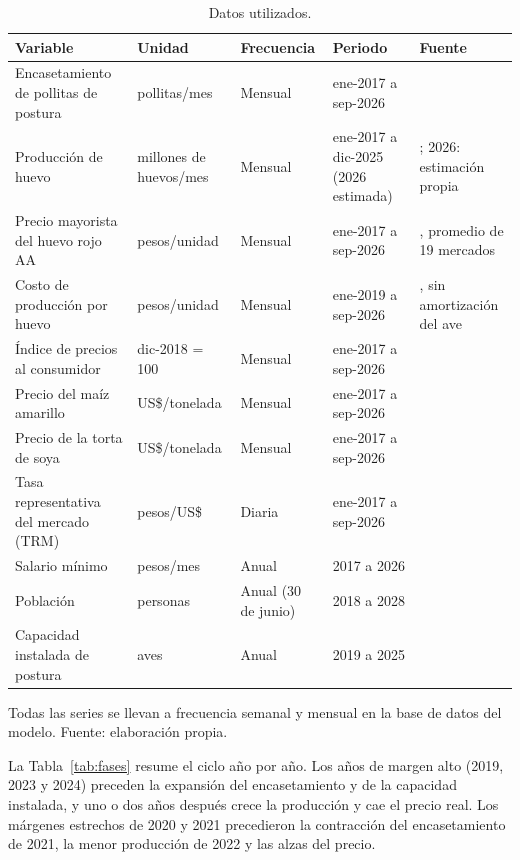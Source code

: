 \documentclass[preprint,12pt,authoryear]{elsarticle}
\begin{document}
\begin{table}[!htbp]
\centering
\caption{Datos utilizados.}
\label{tab:datos}
\footnotesize
\setlength{\tabcolsep}{4pt}
\begin{tabularx}{\textwidth}{@{}P{3.0cm}P{2.1cm}P{1.5cm}P{2.1cm}L@{}}
\toprule
Variable & Unidad & Frecuencia & Periodo & Fuente \\
\midrule
Encasetamiento de pollitas de postura & pollitas/mes & Mensual & ene-2017 a sep-2026 & \citet{Fenavi2026Estadisticas} \\
Producción de huevo & millones de huevos/mes & Mensual & ene-2017 a dic-2025 (2026 estimada) & \citet{Fenavi2026Fenaviquin440}; 2026: estimación propia \\
Precio mayorista del huevo rojo AA & pesos/unidad & Mensual & ene-2017 a sep-2026 & \citet{DANE2026SIPSA}, promedio de 19 mercados \\
Costo de producción por huevo & pesos/unidad & Mensual & ene-2019 a sep-2026 & \citet{Fenavi2026Costos}, sin amortización del ave \\
Índice de precios al consumidor & dic-2018 = 100 & Mensual & ene-2017 a sep-2026 & \citet{DANE2026IPC} \\
Precio del maíz amarillo & US\$/tonelada & Mensual & ene-2017 a sep-2026 & \citet{WorldBank2026PinkSheet} \\
Precio de la torta de soya & US\$/tonelada & Mensual & ene-2017 a sep-2026 & \citet{WorldBank2026PinkSheet} \\
Tasa representativa del mercado (TRM) & pesos/US\$ & Diaria & ene-2017 a sep-2026 & \citet{BanRep2026} \\
Salario mínimo & pesos/mes & Anual & 2017 a 2026 & \citet{BanRep2026} \\
Población & personas & Anual (30 de junio) & 2018 a 2028 & \citet{DANE2025Poblacion} \\
Capacidad instalada de postura & aves & Anual & 2019 a 2025 & \citet{ICA2025Censo} \\
\bottomrule
\end{tabularx}

\smallskip
{\footnotesize\raggedright Todas las series se llevan a frecuencia semanal y mensual en la base de datos del modelo. Fuente: elaboración propia.\par}
\end{table}

La Tabla~\ref{tab:fases} resume el ciclo año por año. Los años de margen alto (2019, 2023 y 2024) preceden la expansión del encasetamiento y de la capacidad instalada, y uno o dos años después crece la producción y cae el precio real. Los márgenes estrechos de 2020 y 2021 precedieron la contracción del encasetamiento de 2021, la menor producción de 2022 y las alzas del precio.
\end{document}
